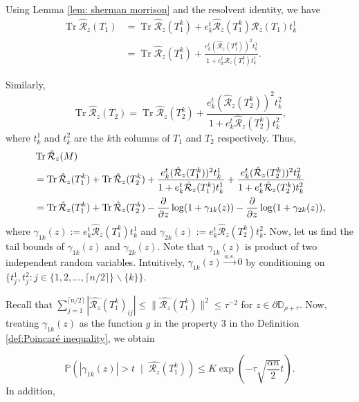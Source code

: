 \documentclass[12pt]{amsart}
\theoremstyle{plain}
\theoremstyle{definition}
\newcommand{\Tr}{\operatorname{Tr}}
\begin{document}
Using Lemma \ref{lem: sherman morrison} and the resolvent identity, we have
\begin{align*}
    \Tr \hat{\mathcal{R}}_z(T_1) &=\Tr \hat{\mathcal{R}}_z(T_1^k)+ e_{k}^{t}\hat{\mathcal{R}}_z(T_1^k) \mathcal{R}_{z}(T_1)t_k^1\\
    &=\Tr \hat{\mathcal{R}}_z(T_1^k)+\frac{e_k^t(\hat{\mathcal{R}}_z(T_1^k))^2t_k^1}{1+e_k^t \hat{\mathcal{R}}_z(T_1^k)t_k^1}.
\end{align*}

Similarly, 
$$
\Tr \hat{\mathcal{R}}_z(T_2) = \Tr \hat{\mathcal{R}}_z(T_2^k) + \frac{e_k^t(\hat{\mathcal{R}}_z(T_2^k))^2t_k^2}{1 + e_k^t \hat{\mathcal{R}}_z(T_2^k)t_k^2},
$$
where $t_k^1$ and $t_k^2$ are the $k$th columns of $T_1$ and $T_2$ respectively. Thus,
\begin{align}
    &\Tr \hat{\mathcal{R}}_z(M)\notag\\ &= \Tr \hat{\mathcal{R}}_z(T_1^k)+\Tr \hat{\mathcal{R}}_z(T_2^k)+\frac{e_k^t(\hat{\mathcal{R}}_z(T_1^k))^2t_k^1}{1+e_k^t \hat{\mathcal{R}}_z(T_1^k)t_k^1}+\frac{e_k^t(\hat{\mathcal{R}}_z(T_2^k))^2t_k^2}{1+e_k^t \hat{\mathcal{R}}_z(T_2^k)t_k^2}\notag\\
    &=\Tr \hat{\mathcal{R}}_z(T_1^k)+\Tr \hat{\mathcal{R}}_z(T_2^k) -\frac{\partial}{\partial z} \log(1+\gamma_{1k}(z))-\frac{\partial}{\partial z} \log(1+\gamma_{2k}(z))\notag,
\end{align}
where $\gamma_{1k}(z):=e_k^t\hat{\mathcal{R}}_z(T_1^k)t_k^1$
and $ \gamma_{2k}(z):=e_k^t\hat{\mathcal{R}}_z(T_2^k)t_k^2$. Now, let us find the tail bounds of $\gamma_{1k}(z)$ and $\gamma_{2k}(z).$ Note that $\gamma_{1k}(z)$ is product of two independent random variables. Intuitively, $\gamma_{1k}(z)\stackrel{a.s.}{\to} 0$ by conditioning on $\{t^{1}_{j}, t^{2}_{j} : j\in \{1,2,...,\lceil n/2 \rceil \} \backslash \{k\}\}$.



Recall that $\sum_{j=1}^{\lceil n/2 \rceil} |\hat{\mathcal{R}_{z}}(T_{1}^k)_{ij}|\leq \|\hat{\mathcal{R}_{z}}(T_{1}^k)\|^2 \leq \tau^{-2}$ for $z\in \partial{\mathbb{D}}_{\rho + \tau}.$ Now, treating $\gamma_{1k}(z)$ as the function $g$ in the property 3 in the Definition \ref{def:Poincaré inequality}, we obtain

\begin{equation}
    \mathbb{P}\left(|\gamma_{1k}(z)|>t \;\;|\;\; \hat{\mathcal{R}_{z}}(T_{1}^k)\right) \leq K \operatorname{exp} \left(-\tau \sqrt{\frac{\alpha n}{2}}t\right) \label{eq: probability estimate of gamma_1k}.
\end{equation}
In addition, 
\end{document}
